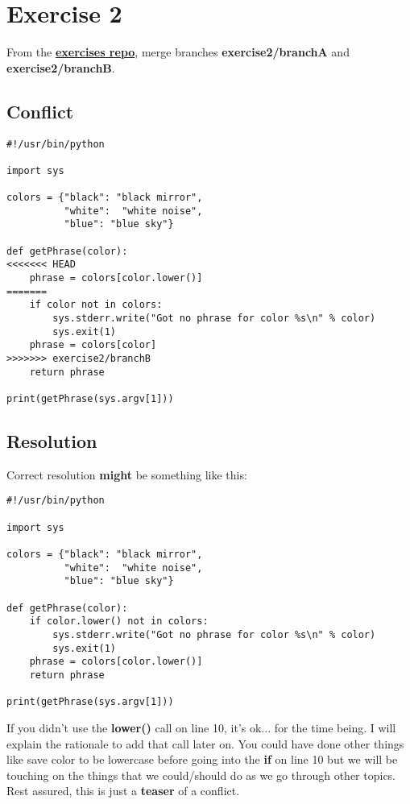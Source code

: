 \section{Exercise 2}
\label{exercise_02}
From the \hyperref[exercises_repo]{\bf exercises repo}, merge branches {\bf exercise2/branchA} and {\bf exercise2/branchB}.

\subsection*{Conflict}
\begin{lstlisting}[style=python_style, caption={\bf Exercise 2} - conflict]
#!/usr/bin/python

import sys

colors = {"black": "black mirror",
          "white":  "white noise",
          "blue": "blue sky"}

def getPhrase(color):
<<<<<<< HEAD
    phrase = colors[color.lower()]
=======
    if color not in colors:
        sys.stderr.write("Got no phrase for color %s\n" % color)
        sys.exit(1)
    phrase = colors[color]
>>>>>>> exercise2/branchB
    return phrase

print(getPhrase(sys.argv[1]))
\end{lstlisting}

\subsection*{Resolution}
Correct resolution {\bf might} be something like this:

\begin{lstlisting}[style=python_style, caption={\bf Exercise 2} - resolution]
#!/usr/bin/python

import sys

colors = {"black": "black mirror",
          "white":  "white noise",
          "blue": "blue sky"}

def getPhrase(color):
    if color.lower() not in colors:
        sys.stderr.write("Got no phrase for color %s\n" % color)
        sys.exit(1)
    phrase = colors[color.lower()]
    return phrase

print(getPhrase(sys.argv[1]))
\end{lstlisting}

If you didn't use the {\bf lower()} call on line 10, it's ok... for the time being. I will explain the rationale to
add that call later on. You could have done other things like save color to be lowercase before going into the {\bf if} on
line 10 but we will be touching on the things that we could/should do as we go through other topics. Rest assured, this is just a {\bf teaser} of a conflict.

